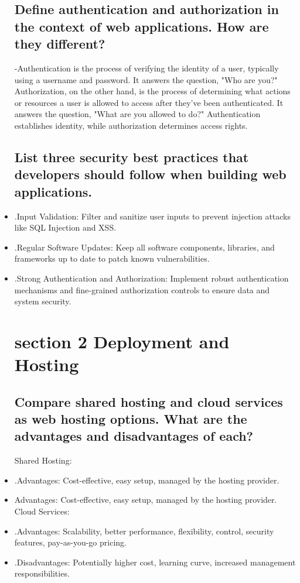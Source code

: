 \documentclass{article}
\begin{document}
\begin{itemize}
\subsection{Define authentication and authorization in the context of web applications. How are they different?}
-Authentication is the process of verifying the identity of a user, typically using a username and password. It answers the question, "Who are you?" Authorization, on the other hand, is the process of determining what actions or resources a user is allowed to access after they've been authenticated. It answers the question, "What are you allowed to do?" Authentication establishes identity, while authorization determines access rights.
\subsection{List three security best practices that developers should follow when building web applications.}
\item .Input Validation: Filter and sanitize user inputs to prevent injection attacks like SQL Injection and XSS.
\item .Regular Software Updates: Keep all software components, libraries, and frameworks up to date to patch known vulnerabilities.
\item .Strong Authentication and Authorization: Implement robust authentication mechanisms and fine-grained authorization controls to ensure data and system security.
\section{section 2 Deployment and Hosting}
\subsection{ Compare shared hosting and cloud services as web hosting options. What are the advantages and disadvantages of each?}
Shared Hosting:
\item  .Advantages: Cost-effective, easy setup, managed by the hosting provider.
\item   Advantages: Cost-effective, easy setup, managed by the hosting provider.
Cloud Services:
\item  .Advantages: Scalability, better performance, flexibility, control, security features, pay-as-you-go pricing.
\item .Disadvantages: Potentially higher cost, learning curve, increased management responsibilities.

\end{itemize}
\end{document}
